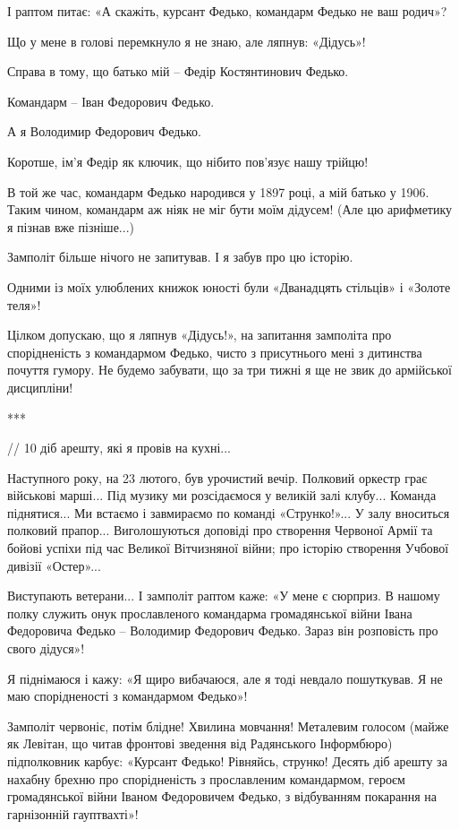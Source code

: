 І раптом питає: «А скажіть, курсант Федько, командарм Федько не ваш родич»? 

Що у мене в голові перемкнуло я не знаю, але ляпнув: «Дідусь»! 

Справа в тому, що батько мій – Федір Костянтинович Федько. 

Командарм – Іван Федорович Федько.

А я Володимир Федорович Федько.

Коротше, ім’я Федір як ключик, що нібито пов’язує нашу трійцю! 

В той же час, командарм Федько народився у 1897 році, а мій батько у 1906.
Таким чином, командарм аж ніяк не міг бути моїм дідусем! (Але цю арифметику я
пізнав вже пізніше...)

Замполіт більше нічого не запитував. І я забув про цю історію.

Одними із моїх улюблених книжок юності були «Дванадцять стільців» і «Золоте
теля»! 

Цілком допускаю, що я ляпнув «Дідусь!», на запитання замполіта про
спорідненість з командармом Федько, чисто з присутнього мені з дитинства
почуття гумору. Не будемо забувати, що за три тижні я ще не звик до армійської
дисципліни!

***

// 10 діб арешту, які я провів на кухні...

Наступного року, на 23 лютого, був урочистий вечір. Полковий оркестр грає
військові марші... Під музику ми розсідаємося у великій залі клубу... Команда
піднятися... Ми встаємо і завмираємо по команді «Струнко!»... У залу вноситься
полковий прапор... Виголошуються доповіді про створення Червоної Армії та бойові
успіхи під час Великої Вітчизняної війни; про історію створення Учбової дивізії
«Остер»...

Виступають ветерани... І замполіт раптом каже: «У мене є сюрприз. В нашому полку
служить онук прославленого командарма громадянської війни Івана Федоровича
Федько – Володимир Федорович Федько. Зараз він розповість про свого дідуся»!

Я піднімаюся і кажу: «Я щиро вибачаюся, але я тоді невдало пошуткував. Я не маю
спорідненості з командармом Федько»!

Замполіт червоніє, потім блідне! Хвилина мовчання! Металевим голосом (майже як
Левітан, що читав фронтові зведення від Радянського Інформбюро) підполковник
карбує: «Курсант Федько! Рівняйсь, струнко! Десять діб арешту за нахабну брехню
про спорідненість з прославленим командармом, героєм громадянської війни Іваном
Федоровичем Федько, з відбуванням покарання на гарнізонній гауптвахті»!

